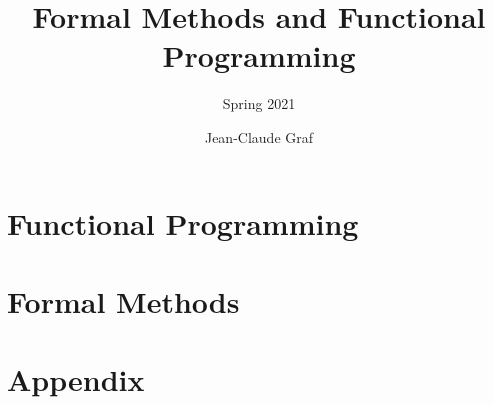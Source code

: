 \documentclass{scrartcl}
\begin{document}
    \rhead{\leftmark}

    \title{Formal Methods and Functional Programming}
    \subtitle{Spring 2021}
    \author{Jean-Claude Graf}
    \maketitle

    \tableofcontents
    \part{Functional Programming}
    
    
    
    
    
    
    
    
    
    \part{Formal Methods}
    
    
    
    
    
    \part{Appendix}
    
    
\end{document}
